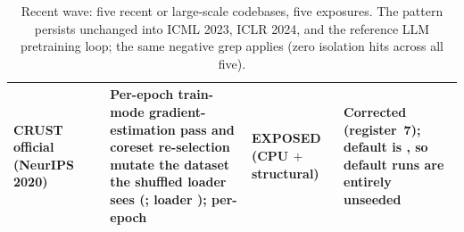 \begin{table}[tbp]
\begin{tabular}{@{}L{2.0cm}L{1.1cm}L{5.7cm}L{1.6cm}L{3.3cm}@{}}
\addlinespace
CRUST official (NeurIPS 2020) &  &
Per-epoch train-mode gradient-estimation pass and coreset re-selection
mutate the dataset the shuffled loader sees
(; loader ); per-epoch
 &
EXPOSED (CPU $+$ structural) &
Corrected (register~7); default  is , so default
runs are entirely unseeded \\
\bottomrule
\end{tabular}
\caption{Recent wave: five recent or large-scale codebases, five
exposures. The pattern persists unchanged into ICML 2023, ICLR 2024, and
the reference LLM pretraining loop; the same negative grep applies
(zero isolation hits across all five).}
\label{tab:recent}
\end{table}

